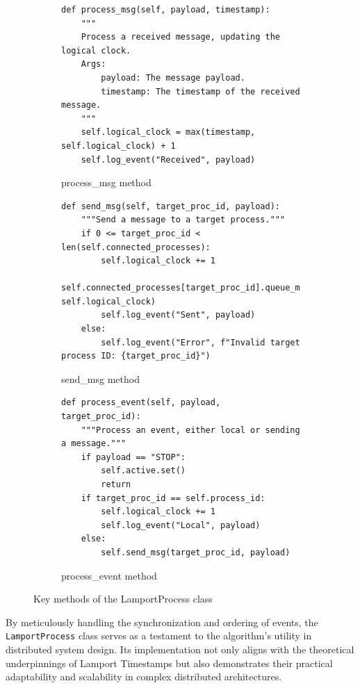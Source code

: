 \documentclass{article}
\begin{document}
      \begin{figure}[h!]
        \centering
        \begin{subfigure}{0.51\textwidth}
        \begin{verbatim}
def process_msg(self, payload, timestamp):
    """
    Process a received message, updating the logical clock.
    Args:
        payload: The message payload.
        timestamp: The timestamp of the received message.
    """
    self.logical_clock = max(timestamp, self.logical_clock) + 1
    self.log_event("Received", payload)
        \end{verbatim}
        \caption{process\_msg method}
        \label{fig:process_msg}
    \end{subfigure}
    \hfill
    \begin{subfigure}{0.51\textwidth}
        \begin{verbatim}
def send_msg(self, target_proc_id, payload):
    """Send a message to a target process."""
    if 0 <= target_proc_id < len(self.connected_processes):
        self.logical_clock += 1
        self.connected_processes[target_proc_id].queue_msg(payload, self.logical_clock)
        self.log_event("Sent", payload)
    else:
        self.log_event("Error", f"Invalid target process ID: {target_proc_id}")
        \end{verbatim}
        \caption{send\_msg method}
        \label{fig:send_msg}
    \end{subfigure}
    \par\bigskip %
    \begin{subfigure}{0.51\textwidth}
        \begin{verbatim}
def process_event(self, payload, target_proc_id):
    """Process an event, either local or sending a message."""
    if payload == "STOP":
        self.active.set()
        return
    if target_proc_id == self.process_id:
        self.logical_clock += 1
        self.log_event("Local", payload)
    else:
        self.send_msg(target_proc_id, payload)
        \end{verbatim}
        \caption{process\_event method}
        \label{fig:process_event}
    \end{subfigure}
    \caption{Key methods of the LamportProcess class}
    \label{fig:lamport_process_methods}
    \end{figure}
      
    By meticulously handling the synchronization and ordering of events, the \texttt{LamportProcess} class serves as a testament to the algorithm's utility in distributed system design. Its implementation not only aligns with the theoretical underpinnings of Lamport Timestamps but also demonstrates their practical adaptability and scalability in complex distributed architectures.
\end{document}
